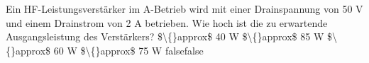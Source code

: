     {Ein HF-Leistungsverstärker im A-Betrieb wird mit einer Drainspannung von 50 V und einem Drainstrom von 2 A betrieben. Wie hoch ist die zu erwartende Ausgangsleistung des Verstärkers?}
    {\$\textbackslash\{\}approx\$ 40 W}
    {\$\textbackslash\{\}approx\$ 85 W}
    {\$\textbackslash\{\}approx\$ 60 W}
    {\$\textbackslash\{\}approx\$ 75 W}
    {false}{false}